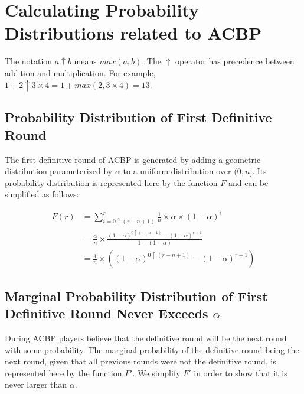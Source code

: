 \documentclass[12pt]{article}
\begin{document}




\appendix
\section{Calculating Probability Distributions related to ACBP }
\label{Appendix:ACBP:Probabilities}

The notation $a \uparrow b$ means $max(a, b)$. The $\uparrow$ operator has precedence between addition and multiplication. For example, $1 + 2 \uparrow 3 \times 4 = 1 + max(2, 3 \times 4) = 13$.

\subsection{Probability Distribution of First Definitive Round}
\label{Appendix:ACBP:Probabilities:FirstDefinitiveRound}

The first definitive round of ACBP is generated by adding a geometric distribution parameterized by $\alpha$ to a uniform distribution over $(0, n]$. Its probability distribution is represented here by the function $F$ and can be simplified as follows:

\begin{align*}
F(r)
  &= \sum_{i=0 \uparrow (r-n+1)}^r \frac{1}{n} \times \alpha \times (1-\alpha)^i
\\&= \frac{\alpha}{n} \times \frac{(1-\alpha)^{0 \uparrow (r-n+1)} - (1-\alpha)^{r+1}}{1 - (1-\alpha)}
\\&= \frac{1}{n} \times ((1-\alpha)^{0 \uparrow (r-n+1)} - (1-\alpha)^{r+1})
\end{align*}

\subsection{Marginal Probability Distribution of First Definitive Round Never Exceeds $\alpha$}
\label{Appendix:ACBP:Probabilities:MarginalFirstDefinitiveRoundBelowAlpha}

During ACBP players believe that the definitive round will be the next round with some probability. The marginal probability of the definitive round being the next round, given that all previous rounds were not the definitive round, is represented here by the function $F'$. We simplify $F'$ in order to show that it is never larger than $\alpha$.
\end{document}
